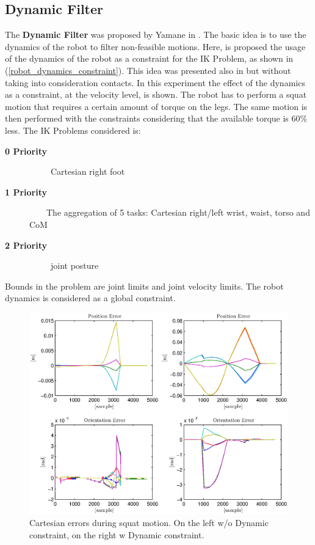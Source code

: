 \subsection{Dynamic Filter}
The \textbf{Dynamic Filter} was proposed by Yamane in \cite{Yamane:04}. The basic idea is to use the dynamics of the robot to filter non-feasible motions. Here, is proposed the usage of the dynamics of the robot as a constraint for the IK Problem, as shown in (\ref{robot_dynamics_constraint}). This idea was presented also in \cite{Park:98} but without taking into consideration contacts. In this experiment the effect of the dynamics as a constraint, at the velocity level, is shown. The robot has to perform a squat motion that requires a certain amount of torque on the legs. The same motion is then performed with the constraints considering that the available torque is $60\%$ less. 
The IK Problems considered is:
\begin{description}
\item[\bf{0 Priority}] \ \ \ \ \ Cartesian right foot 
\item[\bf{1 Priority}] \ \ \ \  The aggregation of 5 tasks: Cartesian right/left wrist,  waist, torso and CoM 
\item[\bf{2 Priority}] \ \ \ \ \ joint posture 
\end{description}
Bounds in the problem are joint limits and joint velocity limits. The robot dynamics is considered as a global constraint.
\begin{figure}[!h]
\vspace{2 mm}
\centering
\includegraphics[width=\textwidth]{gfx/Cartesian_error_dyn.eps}
\caption{Cartesian errors during squat motion. On the left w/o Dynamic constraint, on the right w Dynamic constraint.}
\label{cartesian_error_dyn}
\end{figure}

